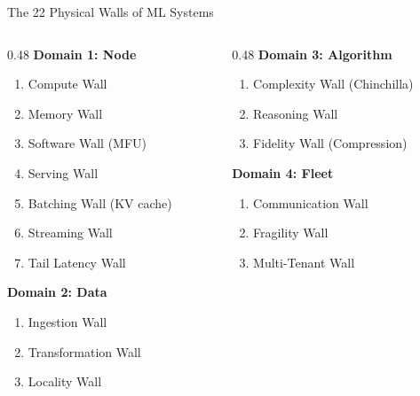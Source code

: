 \documentclass[aspectratio=169, 12pt]{beamer}
\begin{document}
\begin{frame}[shrink]{The 22 Physical Walls of ML Systems}

\scriptsize
\begin{columns}[T]
\begin{column}{0.48\textwidth}
\textbf{Domain 1: Node}\\[2pt]
\begin{enumerate}\setlength\itemsep{1pt}
  \item Compute Wall
  \item Memory Wall
  \item Software Wall (MFU)
  \item Serving Wall
  \item Batching Wall (KV cache)
  \item Streaming Wall
  \item Tail Latency Wall
\end{enumerate}

\vspace{0.2cm}
\textbf{Domain 2: Data}\\[2pt]
\begin{enumerate}\setlength\itemsep{1pt}\setcounter{enumi}{7}
  \item Ingestion Wall
  \item Transformation Wall
  \item Locality Wall
\end{enumerate}
\end{column}

\begin{column}{0.48\textwidth}
\textbf{Domain 3: Algorithm}\\[2pt]
\begin{enumerate}\setlength\itemsep{1pt}\setcounter{enumi}{10}
  \item Complexity Wall (Chinchilla)
  \item Reasoning Wall
  \item Fidelity Wall (Compression)
\end{enumerate}

\vspace{0.2cm}
\textbf{Domain 4: Fleet}\\[2pt]
\begin{enumerate}\setlength\itemsep{1pt}\setcounter{enumi}{13}
  \item Communication Wall
  \item Fragility Wall
  \item Multi-Tenant Wall
\end{enumerate}


\end{column}
\end{columns}
\end{frame}
\end{document}
